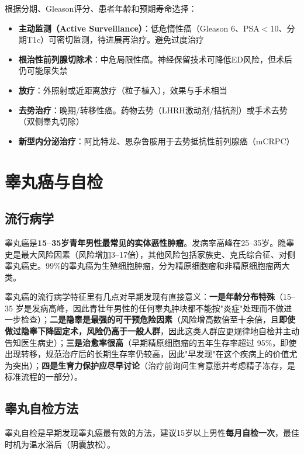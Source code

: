 根据分期、Gleason评分、患者年龄和预期寿命选择：

\begin{itemize}[leftmargin=2cm]
	\item \textbf{主动监测（Active Surveillance）}：低危惰性癌（Gleason 6、PSA$<$10、分期T1c）可密切监测，待进展再治疗。避免过度治疗
	\item \textbf{根治性前列腺切除术}：中危局限性癌。神经保留技术可降低ED风险，但术后仍可能尿失禁
	\item \textbf{放疗}：外照射或近距离放疗（粒子植入），效果与手术相当
	\item \textbf{去势治疗}：晚期/转移性癌。药物去势（LHRH激动剂/拮抗剂）或手术去势（双侧睾丸切除）
	\item \textbf{新型内分泌治疗}：阿比特龙、恩杂鲁胺用于去势抵抗性前列腺癌（mCRPC）
\end{itemize}

\section{睾丸癌与自检}
\label{sec:testicular_cancer}

\subsection{流行病学}

睾丸癌是\textbf{15--35岁青年男性最常见的实体恶性肿瘤}。发病率高峰在25--35岁。隐睾史是最大风险因素（风险增加3--17倍），其他风险包括家族史、克氏综合征、对侧睾丸癌史。99\%的睾丸癌为生殖细胞肿瘤，分为精原细胞瘤和非精原细胞瘤两大类。


睾丸癌的流行病学特征里有几点对早期发现有直接意义：\textbf{一是年龄分布特殊}（15--35 岁是发病高峰，因此青壮年男性的任何睾丸肿块都不能按"炎症"处理而不做进一步检查）；\textbf{二是隐睾是最强的可干预危险因素}（风险增高数倍至十余倍，且\textbf{即使做过隐睾下降固定术，风险仍高于一般人群}，因此这类人群应更规律地自检并主动告知医生病史）；\textbf{三是治愈率很高}（早期精原细胞瘤的五年生存率超过 95\%，即使出现转移，规范治疗后的长期生存率仍较高，因此"早发现"在这个疾病上的价值尤为突出）；\textbf{四是生育力保护应尽早讨论}（治疗前询问生育意愿并考虑精子冻存，是标准流程的一部分）。

\subsection{睾丸自检方法}

睾丸自检是早期发现睾丸癌最有效的方法，建议15岁以上男性\textbf{每月自检一次}，最佳时机为温水浴后（阴囊放松）。

